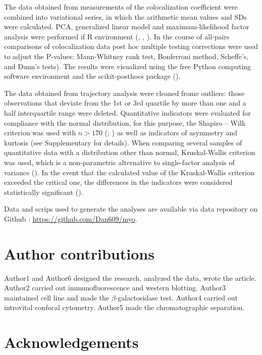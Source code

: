 \documentclass[alpha-refs]{wiley-article}
\begin{document}
The data obtained from measurements of the colocalization coefficient were combined into variational series, in which the arithmetic mean values and SDs were calculated.
PCA, generalized linear model and maximum-likelihood factor analysis were performed if R environment (\cite{husson2010exploratory}, \cite{dobson2008introduction}, \cite{lawley1971factor}).
In the course of all-pairs comparisons of colocalization data post hoc multiple testing corrections were used to adjust the P-values: Mann-Whitney rank test, Bonferroni method, Scheffe’s, and Dunn’s tests).
The results were visualized using the free Python computing software environment and the scikit-posthocs package (\cite{Terpilowski2019}).

The data obtained from trajectory analysis were cleaned frome outliers: those observations that deviate from the 1st or 3rd quartile by more than one and a half interquartile range were deleted.
Quantitative indicators were evaluated for compliance with the normal distribution, for this purpose, the Shapiro – Wilk criterion  was used with $n > 170$ (\cite{shapiro1965analysis}; \cite{shapiro1972approximate}) as well as indicators of asymmetry and kurtosis (see Supplementary for details).
When comparing several samples of quantitative data with a distribution other than normal, Kruskal-Wallis criterion was used, which is a non-parametric alternative to single-factor analysis of variance (\cite{kruskal1952use}).
In the event that the calculated value of the Kruskal-Wallis criterion exceeded the critical one, the differences in the indicators were considered statistically significant (\cite{wilcoxon1992individual}).

Data and scrips used to generate the analyses are available via data repository on Github : \url{https://github.com/Dan609/myo}.


\section*{Author contributions}

Author1 and Author6 designed the research, analyzed the data, wrote the article.
Author2 carried out immunofluorescence and western blotting.
Author3 maintained cell line and made the $\beta$-galactosidase test.
Author4 carried out introvital confocal cytometry.
Author5 made the chromatographic separation.

\section*{Acknowledgements}
\end{document}
